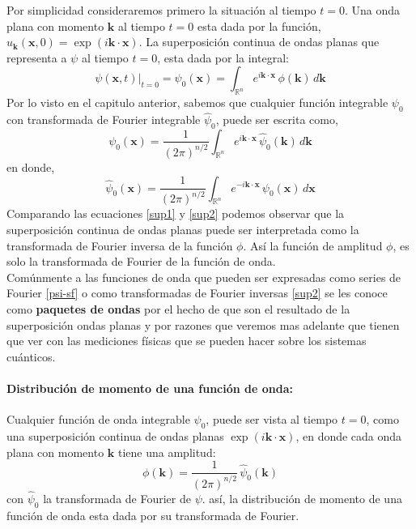 \documentclass[12pt]{book}
\numberwithin{equation}{chapter}
\def\R{\mathbb{R}}
\def\x{\mathbf{x}}
\def\k{\mathbf{k}}
\begin{document}
Por simplicidad consideraremos primero la situaci\'on al tiempo $t=0$. Una onda plana con momento $\k$ al tiempo $t=0$ esta dada por la funci\'on, $u_{\k}(\x,0)= \exp (i \k \cdot \x)$. La superposici\'on continua de ondas planas que representa a $\psi$ al tiempo $t=0$, esta dada por la integral:
\begin{equation}\label{sup1}
\psi(\x ,t) \Big|_{t=0}= \psi_{0}(\x)= \int_{\R^{n}} e^{i \k \cdot \x}\, \phi(\k)\, d\k
\end{equation}
Por lo visto en el capitulo anterior, sabemos que cualquier funci\'on integrable $\psi_{0}$ con transformada de Fourier integrable $\hat{\psi}_{0}$, puede ser escrita como,
\begin{equation}\label{sup2}
\psi_{0}(\x)= \frac{1}{(2\pi)^{n/2}} \int_{\R^{n}} e^{i\k \cdot \x}\, \hat{\psi}_{0}(\k) \, d\k
\end{equation}
en donde,
\begin{equation}
\hat{\psi}_{0}(\x)= \frac{1}{(2\pi)^{n/2}} \int_{\R^{n}} e^{-i\k \cdot \x}\, \psi_{0}(\x) \, d\x
\end{equation}
Comparando las ecuaciones \eqref{sup1} y \eqref{sup2} podemos observar que la superposici\'on continua de ondas planas puede ser interpretada como la transformada de Fourier inversa de la funci\'on $\phi$. As\'i la funci\'on de amplitud $\phi$, es solo la transformada de Fourier de la funci\'on de onda. \\
Com\'unmente a las funciones de onda que pueden ser expresadas como series de Fourier \eqref{psi-sf} o como transformadas de Fourier inversas \eqref{sup2} se les conoce como {\bf paquetes de ondas} por el hecho de que son el resultado de la superposici\'on ondas planas y por razones que veremos mas adelante que tienen que ver con las mediciones f\'isicas que se pueden hacer sobre los sistemas cu\'anticos.

\paragraph{Distribuci\'on de momento de una funci\'on de onda:} Cualquier funci\'on de onda integrable $\psi_{0}$, puede ser vista al tiempo $t=0$, como una superposici\'on continua de ondas planas $\exp ( i \k \cdot \x )$, en donde cada onda plana con momento $\k$ tiene una amplitud:
\begin{equation}
\phi (\k)= \frac{1}{(2\pi)^{n/2}}\, \hat{\psi}_{0}(\k)
\end{equation}
con $\hat{\psi}_{0}$ la transformada de Fourier de $\psi$. as\'i, la distribuci\'on de momento de una funci\'on de onda esta dada por su transformada de Fourier.
\rightline{$\dag$}
\end{document}

